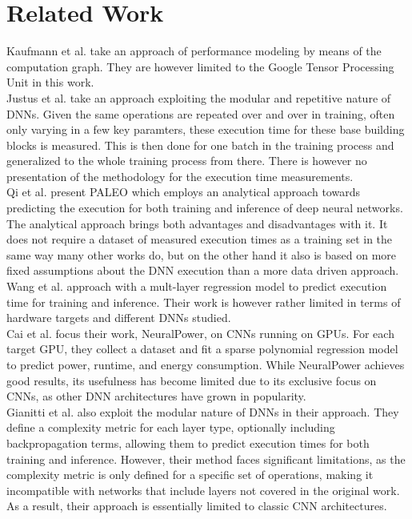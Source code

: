 \section{Related Work}
Kaufmann et al. take an approach of performance modeling by means of the computation graph. They are
however limited to the Google Tensor Processing Unit in this work. \\
Justus et al. take an approach exploiting the modular and repetitive nature of DNNs. Given the same operations
are repeated over and over in training, often only varying in a few key paramters, these execution time for
these base building blocks is measured. This is then done for one batch in the training process and
generalized to the whole training process from there. There is however no presentation of the 
methodology for the execution time measurements. \\
Qi et al. present PALEO which employs an analytical approach towards predicting the execution for both
training and inference of deep neural networks. The analytical approach brings both advantages and disadvantages
with it. It does not require a dataset of measured execution times as a training set in the same way many 
other works do, but on the other hand it also is based on more fixed assumptions about the DNN execution 
than a more data driven approach. \\
Wang et al. approach with a mult-layer regression model to predict execution time for training and inference.
Their work is however rather limited in terms of hardware targets and different DNNs studied. \\
Cai et al. focus their work, NeuralPower, on CNNs running on GPUs. For each target GPU, they collect
a dataset and fit a sparse polynomial regression model to predict power, runtime, and energy consumption.
While NeuralPower achieves good results, its usefulness has become limited due to its exclusive focus on 
CNNs, as other DNN architectures have grown in popularity. \\
Gianitti et al. also exploit the modular nature of DNNs in their approach. They define a complexity
metric for each layer type, optionally including backpropagation terms, allowing them to predict
execution times for both training and inference. However, their method faces significant limitations,
as the complexity metric is only defined for a specific set of operations, making it incompatible with
networks that include layers not covered in the original work. As a result, their approach is essentially
limited to classic CNN architectures. \\
